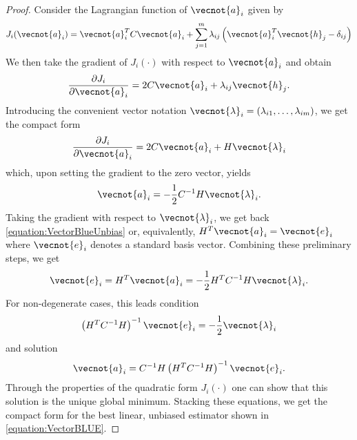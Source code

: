 \begin{proof}
Consider the Lagrangian function of $\vecnot{a}_i$ given by
\begin{equation*}
J_i (\vecnot{a}_i) = \vecnot{a}_i^T C \vecnot{a}_i
+ \sum_{j=1}^m \lambda_{ij} \left( \vecnot{a}_i^T \vecnot{h}_j - \delta_{ij} \right)
\end{equation*}
We then take the gradient of $J_i (\cdot)$ with respect to $\vecnot{a}_i$ and obtain
\begin{equation*}
\frac{\partial J_i}{\partial \vecnot{a}_i} = 2 C \vecnot{a}_i + \lambda_{ij} \vecnot{h}_j .
\end{equation*}
Introducing the convenient vector notation $\vecnot{\lambda}_i = (\lambda_{i1}, \ldots, \lambda_{im})$, we get the compact form
\begin{equation*}
\frac{\partial J_i}{\partial \vecnot{a}_i} = 2 C \vecnot{a}_i + H \vecnot{\lambda}_{i}
\end{equation*}
which, upon setting the gradient to the zero vector, yields
\begin{equation*}
\vecnot{a}_i = - \frac{1}{2} C^{-1} H \vecnot{\lambda}_i .
\end{equation*}
Taking the gradient with respect to $\vecnot{\lambda}_i$, we get back \eqref{equation:VectorBlueUnbias} or, equivalently, $H^T \vecnot{a}_i = \vecnot{e}_i$ where $\vecnot{e}_i$ denotes a standard basis vector.
Combining these preliminary steps, we get
\begin{equation*}
\vecnot{e}_i = H^T \vecnot{a}_i = - \frac{1}{2} H^T C^{-1} H \vecnot{\lambda}_i .
\end{equation*}
For non-degenerate cases, this leads condition
\begin{equation*}
\left( H^T C^{-1} H \right)^{-1} \vecnot{e}_i
= - \frac{1}{2} \vecnot{\lambda}_i
\end{equation*}
and solution
\begin{equation*}
\vecnot{a}_i = C^{-1} H \left( H^T C^{-1} H \right)^{-1} \vecnot{e}_i .
\end{equation*}
Through the properties of the quadratic form $J_i (\cdot)$ one can show that this solution is the unique global minimum.
Stacking these equations, we get the compact form for the best linear, unbiased estimator shown in \eqref{equation:VectorBLUE}.
\end{proof}

